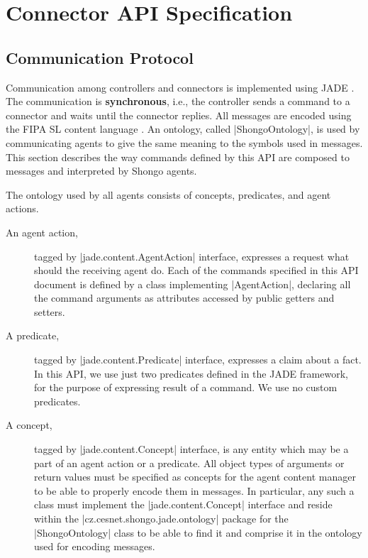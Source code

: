 \chapter{Connector API Specification}



\section{Communication Protocol}


Communication among controllers and connectors is implemented using JADE \cite{jade}. The communication is \textbf{synchronous}, i.e., the controller sends a command to a connector and waits until the connector replies. All messages are encoded using the FIPA SL content language \cite{FIPA-SL}. An ontology, called |ShongoOntology|, is used by communicating agents to give the same meaning to the symbols used in messages. This section describes the way commands defined by this API are composed to messages and interpreted by Shongo agents.

The ontology used by all agents consists of concepts, predicates, and agent actions.
\begin{description}
\item[An agent action,] tagged by |jade.content.AgentAction| interface, expresses a request what should the receiving agent do. Each of the commands specified in this API document is defined by a class implementing |AgentAction|, declaring all the command arguments as attributes accessed by public getters and setters.
\item[A predicate,] tagged by |jade.content.Predicate| interface, expresses a claim about a fact. In this API, we use just two predicates defined in the JADE framework, for the purpose of expressing result of a command. We use no custom predicates.
\item[A concept,] tagged by |jade.content.Concept| interface, is any entity which may be a part of an agent action or a predicate. All object types of arguments or return values must be specified as concepts for the agent content manager to be able to properly encode them in messages. In particular, any such a class must implement the |jade.content.Concept| interface and reside within the |cz.cesnet.shongo.jade.ontology| package for the |ShongoOntology| class to be able to find it and comprise it in the ontology used for encoding messages.
\end{description}



